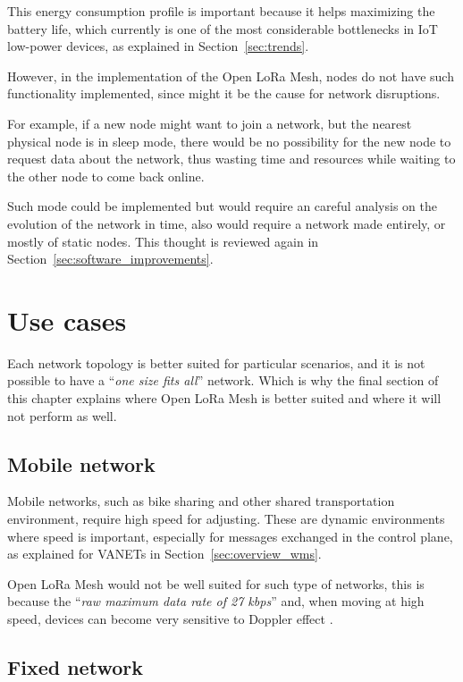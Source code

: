 		This energy consumption profile is important because it helps maximizing the battery life, which currently is one of the most considerable bottlenecks in IoT low-power devices, as explained in Section~\ref{sec:trends}.
		
		However, in the implementation of the Open LoRa Mesh, nodes do not have such functionality implemented, since might it be the cause for network disruptions.
		
		For example, if a new node might want to join a network, but the nearest physical node is in sleep mode, there would be no possibility for the new node to request data about the network, thus wasting time and resources while waiting to the other node to come back online.
		
		Such mode could be implemented but would require an careful analysis on the evolution of the network in time, also would require a network made entirely, or mostly of static nodes.
		This thought is reviewed again in Section~\ref{sec:software_improvements}.
			
	\section{Use cases}
		
		Each network topology is better suited for particular scenarios, and it is not possible to have a ``\textit{one size fits all}'' network.
		Which is why the final section of this chapter explains where Open LoRa Mesh is better suited and where it will not perform as well.
		
		\subsection{Mobile network}
		
			Mobile networks, such as bike sharing and other shared transportation environment, require high speed for adjusting. 
			These are dynamic environments where speed is important, especially for messages exchanged in the control plane, as explained for VANETs in Section~\ref{sec:overview_wms}.
			
			Open LoRa Mesh would not be well suited for such type of networks, this is because the ``\textit{raw maximum data rate of 27 kbps}'' \cite{8030482} and, when moving at high speed, devices can become very sensitive to Doppler effect \cite{s21124049}.
		
		\subsection{Fixed network}\label{sec:fixed_network}
		
